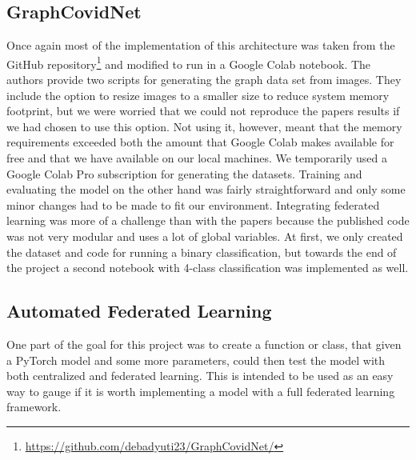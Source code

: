 \subsection{GraphCovidNet}
Once again most of the implementation of this architecture was taken from the GitHub repository\footnote{\url{https://github.com/debadyuti23/GraphCovidNet/}} and modified to run in a Google Colab notebook. 
The authors provide two scripts for generating the graph data set from images. They include the option to resize images to a smaller size to reduce system memory footprint, but we were worried that we could not reproduce the papers results if we had chosen to use this option. Not using it, however, meant that the memory requirements exceeded both the amount that Google Colab makes available for free and that we have available on our local machines. We temporarily used a Google Colab Pro subscription for generating the datasets.
Training and evaluating the model on the other hand was fairly straightforward and only some minor changes had to be made to fit our environment. Integrating federated learning was more of a challenge than with the papers because the published code was not very modular and uses a lot of global variables.
At first, we only created the dataset and code for running a binary classification, but towards the end of the project a second notebook with 4-class classification was implemented as well.

\subsection{Automated Federated Learning}\label{subsec:methods_automated_fl}
One part of the goal for this project was to create a function or class, that given a PyTorch model and some more parameters, could then test the model with both centralized and federated learning. This is intended to be used as an easy way to gauge if it is worth implementing a model with a full federated learning framework. 

